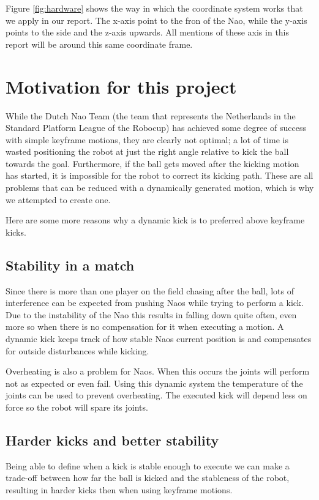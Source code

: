 \documentclass[a4paper]{article}
\begin{document}
Figure \ref{fig:hardware} shows the way in which the coordinate system works that we
apply in our report. The x-axis point to the fron of the Nao, while the y-axis
points to the side and the z-axis upwards. All mentions of these axis in this
report will be around this same coordinate frame.



\section{Motivation for this project} 
While the Dutch Nao Team\cite{DNT2012} (the team that represents the Netherlands
in the Standard Platform League of the Robocup) has achieved some degree of
success with simple keyframe motions, they are clearly not optimal; a lot of
time is wasted positioning the robot at just the right angle relative to kick
the ball towards the goal. Furthermore, if the ball gets moved after the kicking
motion has started, it is impossible for the robot to correct its kicking path.
These are all problems that can be reduced with a dynamically generated motion,
which is why we attempted to create one. 

Here are some more reasons why a dynamic kick is to preferred above keyframe
kicks.

\subsection{Stability in a match}
Since there is more than one player on
the field  chasing after the ball,
lots of interference can be expected from pushing Naos while trying to perform a kick. Due to the
instability of the Nao this results in falling down quite often, even more
so when there is no compensation for it when executing a motion. A dynamic
kick keeps track of how stable Naos current position is and compensates for
outside disturbances while kicking. 

Overheating is also a problem for Naos. When this occurs the joints will perform
not as expected or even fail. Using this dynamic system the temperature of the
joints can be used to prevent overheating. The executed kick will depend less
on force so the robot will spare its joints.

\subsection{Harder kicks and better stability}
Being able to define when a kick is stable enough to execute we can make a
trade-off between how far the ball is kicked and the stableness of the
robot, resulting in harder kicks then when using keyframe motions.
\end{document}
